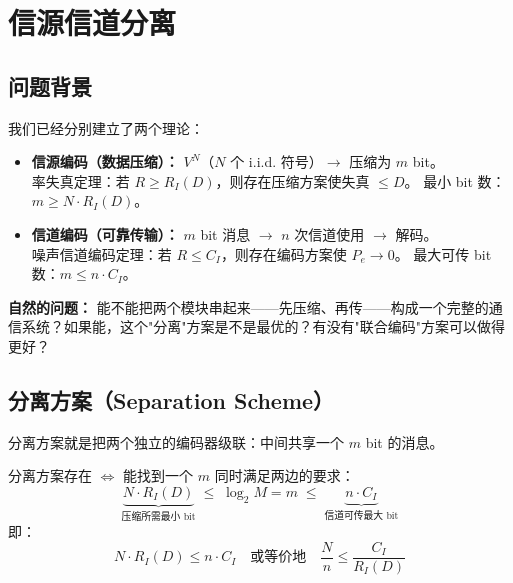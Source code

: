 \documentclass[12pt,a4paper]{ctexart}
\theoremstyle{definition}
\begin{document}
\section{信源信道分离}

\subsection{问题背景}

我们已经分别建立了两个理论：

\begin{itemize}[nosep]
  \item \textbf{信源编码（数据压缩）：} $V^N$（$N$ 个 i.i.d. 符号）$\to$ 压缩为 $m$ bit。\\
  率失真定理：若 $R \geq R_I(D)$，则存在压缩方案使失真 $\leq D$。
  最小 bit 数：$m \geq N \cdot R_I(D)$。

  \item \textbf{信道编码（可靠传输）：} $m$ bit 消息 $\to$ $n$ 次信道使用 $\to$ 解码。\\
  噪声信道编码定理：若 $R \leq C_I$，则存在编码方案使 $P_e \to 0$。
  最大可传 bit 数：$m \leq n \cdot C_I$。
\end{itemize}

\textbf{自然的问题：} 能不能把两个模块串起来——先压缩、再传——构成一个完整的通信系统？如果能，这个"分离"方案是不是最优的？有没有"联合编码"方案可以做得更好？

\subsection{分离方案（Separation Scheme）}

\begin{center}
\end{center}

分离方案就是把两个独立的编码器级联：中间共享一个 $m$ bit 的消息。

\begin{keybox}[分离方案的可行性条件]
分离方案存在 $\iff$ 能找到一个 $m$ 同时满足两边的要求：
\[
\underbrace{N \cdot R_I(D)}_{\text{压缩所需最小 bit}} \;\leq\; \log_2 M = m \;\leq\; \underbrace{n \cdot C_I}_{\text{信道可传最大 bit}}
\]
即：
\[
\boxed{N \cdot R_I(D) \leq n \cdot C_I}
\quad\text{或等价地}\quad
\boxed{\frac{N}{n} \leq \frac{C_I}{R_I(D)}}
\]
\end{keybox}
\end{document}
